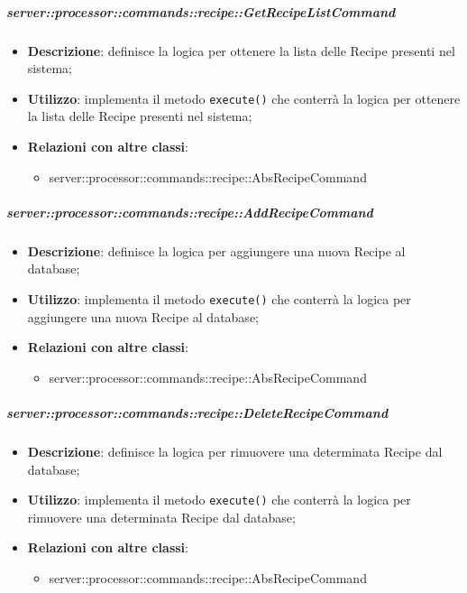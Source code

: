         \subparagraph{server::processor::commands::recipe::GetRecipeListCommand} %
        \label{subp:bdsm_app_server_processor_commands_recipe_getrecipelistcommand}
        \begin{itemize}
          \item \textbf{Descrizione}: definisce la logica per ottenere la lista delle Recipe presenti nel sistema;
          \item \textbf{Utilizzo}: implementa il metodo \texttt{execute()} che conterrà la logica per ottenere la lista delle Recipe presenti nel sistema;
          \item \textbf{Relazioni con altre classi}:
            \begin{itemize}
              \item server::processor::commands::recipe::AbsRecipeCommand
            \end{itemize}
        \end{itemize}

        \subparagraph{server::processor::commands::recipe::AddRecipeCommand} %
        \label{subp:bdsm_app_server_processor_commands_recipe_addrecipecommand}
        \begin{itemize}
          \item \textbf{Descrizione}: definisce la logica per aggiungere una nuova Recipe al database;
          \item \textbf{Utilizzo}: implementa il metodo \texttt{execute()} che conterrà la logica per aggiungere una nuova Recipe al database;
          \item \textbf{Relazioni con altre classi}:
            \begin{itemize}
              \item server::processor::commands::recipe::AbsRecipeCommand
            \end{itemize}
        \end{itemize}

        \subparagraph{server::processor::commands::recipe::DeleteRecipeCommand} %
        \label{subp:bdsm_app_server_processor_commands_recipe_deleterecipecommand}
        \begin{itemize}
          \item \textbf{Descrizione}: definisce la logica per rimuovere una determinata Recipe dal database;
          \item \textbf{Utilizzo}: implementa il metodo \texttt{execute()} che conterrà la logica per rimuovere una determinata Recipe dal database;
          \item \textbf{Relazioni con altre classi}:
            \begin{itemize}
              \item server::processor::commands::recipe::AbsRecipeCommand
            \end{itemize}
        \end{itemize}

